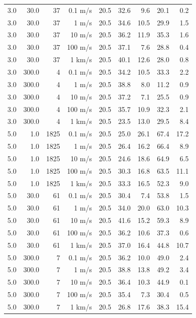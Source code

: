 \begin{table}
\begin{tabular}{rrrrrrrrr}
3.0 & 30.0 & 37 & 0.1 m/s & 20.5 & 32.6 & 9.6 & 20.1 & 0.2 \\
3.0 & 30.0 & 37 & 1 m/s & 20.5 & 34.6 & 10.5 & 29.9 & 1.5 \\
3.0 & 30.0 & 37 & 10 m/s & 20.5 & 36.2 & 11.9 & 35.3 & 1.6 \\
3.0 & 30.0 & 37 & 100 m/s & 20.5 & 37.1 & 7.6 & 28.8 & 0.4 \\
3.0 & 30.0 & 37 & 1 km/s & 20.5 & 40.1 & 12.6 & 28.0 & 0.8 \\
3.0 & 300.0 & 4 & 0.1 m/s & 20.5 & 34.2 & 10.5 & 33.3 & 2.2 \\
3.0 & 300.0 & 4 & 1 m/s & 20.5 & 38.8 & 8.0 & 11.2 & 0.9 \\
3.0 & 300.0 & 4 & 10 m/s & 20.5 & 37.2 & 7.1 & 25.5 & 0.9 \\
3.0 & 300.0 & 4 & 100 m/s & 20.5 & 35.7 & 10.9 & 32.3 & 2.1 \\
3.0 & 300.0 & 4 & 1 km/s & 20.5 & 23.5 & 13.0 & 29.5 & 8.4 \\
5.0 & 1.0 & 1825 & 0.1 m/s & 20.5 & 25.0 & 26.1 & 67.4 & 17.2 \\
5.0 & 1.0 & 1825 & 1 m/s & 20.5 & 26.4 & 16.2 & 66.4 & 8.9 \\
5.0 & 1.0 & 1825 & 10 m/s & 20.5 & 24.6 & 18.6 & 64.9 & 6.5 \\
5.0 & 1.0 & 1825 & 100 m/s & 20.5 & 30.3 & 16.8 & 63.5 & 11.1 \\
5.0 & 1.0 & 1825 & 1 km/s & 20.5 & 33.3 & 16.5 & 52.3 & 9.0 \\
5.0 & 30.0 & 61 & 0.1 m/s & 20.5 & 30.4 & 7.4 & 53.8 & 1.5 \\
5.0 & 30.0 & 61 & 1 m/s & 20.5 & 34.0 & 20.0 & 63.0 & 10.3 \\
5.0 & 30.0 & 61 & 10 m/s & 20.5 & 41.6 & 15.2 & 59.3 & 8.9 \\
5.0 & 30.0 & 61 & 100 m/s & 20.5 & 36.2 & 10.6 & 37.3 & 0.6 \\
5.0 & 30.0 & 61 & 1 km/s & 20.5 & 37.0 & 16.4 & 44.8 & 10.7 \\
5.0 & 300.0 & 7 & 0.1 m/s & 20.5 & 36.2 & 10.0 & 49.0 & 2.4 \\
5.0 & 300.0 & 7 & 1 m/s & 20.5 & 38.8 & 13.8 & 49.2 & 3.4 \\
5.0 & 300.0 & 7 & 10 m/s & 20.5 & 36.4 & 10.3 & 44.9 & 0.1 \\
5.0 & 300.0 & 7 & 100 m/s & 20.5 & 35.4 & 7.3 & 30.4 & 0.5 \\
5.0 & 300.0 & 7 & 1 km/s & 20.5 & 26.8 & 17.6 & 38.3 & 15.4 \\
\hline
\end{tabular}
\end{table}
